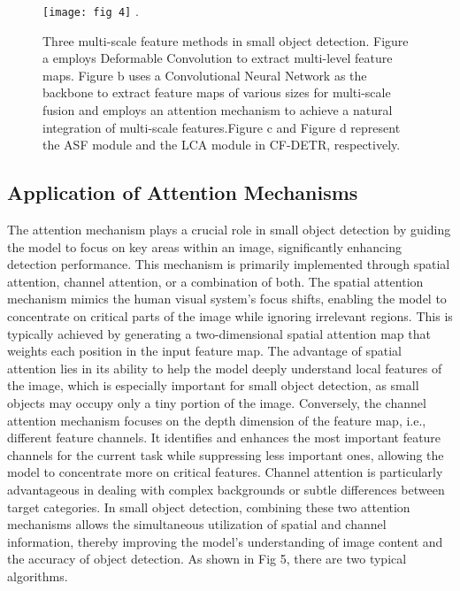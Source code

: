 \documentclass[journal]{IEEEtran}
\begin{document}
\begin{figure}[htbp]
	\centering
	\setlength{\abovecaptionskip}{-0.6cm}
	\texttt{[image: fig 4]}
	\DeclareGraphicsExtensions.
	\caption{Three multi-scale feature methods in small object detection. Figure a employs Deformable Convolution to extract multi-level feature maps. Figure b uses a Convolutional Neural Network as the backbone to extract feature maps of various sizes for multi-scale fusion and employs an attention mechanism to achieve a natural integration of multi-scale features.Figure c and Figure d represent the ASF module and the LCA module in CF-DETR, respectively.}
	\label{fig 1}
\end{figure}


\subsection{Application of Attention Mechanisms}

The attention mechanism plays a crucial role in small object detection by guiding the model to focus on key areas within an image, significantly enhancing detection performance. This mechanism is primarily implemented through spatial attention, channel attention, or a combination of both. The spatial attention mechanism mimics the human visual system's focus shifts, enabling the model to concentrate on critical parts of the image while ignoring irrelevant regions. This is typically achieved by generating a two-dimensional spatial attention map that weights each position in the input feature map. The advantage of spatial attention lies in its ability to help the model deeply understand local features of the image, which is especially important for small object detection, as small objects may occupy only a tiny portion of the image. Conversely, the channel attention mechanism focuses on the depth dimension of the feature map, i.e., different feature channels. It identifies and enhances the most important feature channels for the current task while suppressing less important ones, allowing the model to concentrate more on critical features. Channel attention is particularly advantageous in dealing with complex backgrounds or subtle differences between target categories. In small object detection, combining these two attention mechanisms allows the simultaneous utilization of spatial and channel information, thereby improving the model's understanding of image content and the accuracy of object detection. As shown in Fig 5, there are two typical algorithms.
\end{document}
